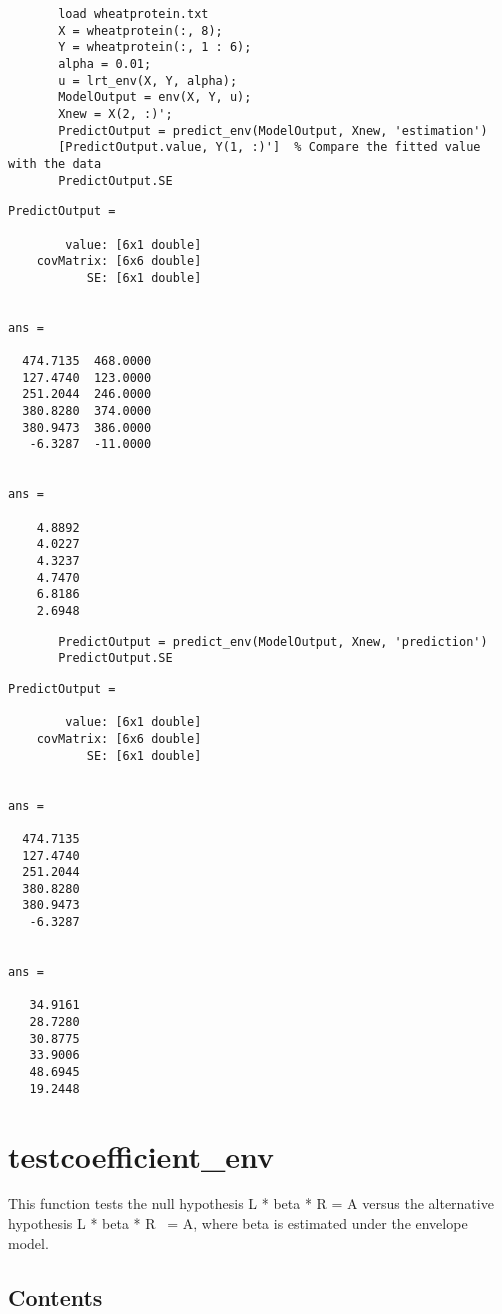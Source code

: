 \documentclass[a4paper,11pt,openany]{memoir}
\begin{document}
\begin{verbatim}       load wheatprotein.txt
       X = wheatprotein(:, 8);
       Y = wheatprotein(:, 1 : 6);
       alpha = 0.01;
       u = lrt_env(X, Y, alpha);
       ModelOutput = env(X, Y, u);
       Xnew = X(2, :)';
       PredictOutput = predict_env(ModelOutput, Xnew, 'estimation')
       [PredictOutput.value, Y(1, :)']  % Compare the fitted value with the data
       PredictOutput.SE
       \end{verbatim}
        \color{lightgray}\ttfamily \begin{verbatim}
PredictOutput = 

        value: [6x1 double]
    covMatrix: [6x6 double]
           SE: [6x1 double]


ans =

  474.7135  468.0000
  127.4740  123.0000
  251.2044  246.0000
  380.8280  374.0000
  380.9473  386.0000
   -6.3287  -11.0000


ans =

    4.8892
    4.0227
    4.3237
    4.7470
    6.8186
    2.6948
\end{verbatim} \rmfamily
\color{black}
       \begin{verbatim}
       PredictOutput = predict_env(ModelOutput, Xnew, 'prediction')
       PredictOutput.SE\end{verbatim}
            \color{lightgray}\ttfamily \begin{verbatim}
PredictOutput = 

        value: [6x1 double]
    covMatrix: [6x6 double]
           SE: [6x1 double]


ans =

  474.7135
  127.4740
  251.2044
  380.8280
  380.9473
   -6.3287


ans =

   34.9161
   28.7280
   30.8775
   33.9006
   48.6945
   19.2448
\end{verbatim} \rmfamily
\color{black}
 
\newpage


\rmfamily
\color{black}\section{testcoefficient\_env}


This function tests the null hypothesis L * beta * R = A versus the
alternative hypothesis L * beta * R ~= A, where beta is estimated under
the envelope model.
    
\subsection*{Contents}
\end{document}
